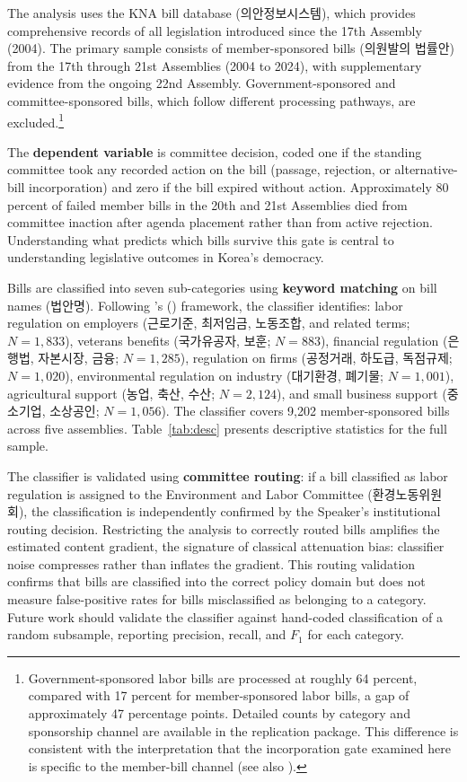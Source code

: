 \documentclass[11pt]{article}
\begin{document}
The analysis uses the KNA bill database (의안정보시스템), which provides comprehensive records of all legislation introduced since the 17th Assembly (2004). The primary sample consists of member-sponsored bills (의원발의 법률안) from the 17th through 21st Assemblies (2004 to 2024), with supplementary evidence from the ongoing 22nd Assembly. Government-sponsored and committee-sponsored bills, which follow different processing pathways, are excluded.\footnote{Government-sponsored labor bills are processed at roughly 64 percent, compared with 17 percent for member-sponsored labor bills, a gap of approximately 47 percentage points. Detailed counts by category and sponsorship channel are available in the replication package. This difference is consistent with the interpretation that the incorporation gate examined here is specific to the member-bill channel (see also \citealp{lee2021}).}

The \textbf{dependent variable} is committee decision, coded one if the standing committee took any recorded action on the bill (passage, rejection, or alternative-bill incorporation) and zero if the bill expired without action. Approximately 80 percent of failed member bills in the 20th and 21st Assemblies died from committee inaction after agenda placement rather than from active rejection. Understanding what predicts which bills survive this gate is central to understanding legislative outcomes in Korea's democracy.

Bills are classified into seven sub-categories using \textbf{keyword matching} on bill names (법안명). Following \citeauthor{wilson1980}'s (\citeyear{wilson1980}) framework, the classifier identifies: labor regulation on employers (근로기준, 최저임금, 노동조합, and related terms; $N = 1{,}833$), veterans benefits (국가유공자, 보훈; $N = 883$), financial regulation (은행법, 자본시장, 금융; $N = 1{,}285$), regulation on firms (공정거래, 하도급, 독점규제; $N = 1{,}020$), environmental regulation on industry (대기환경, 폐기물; $N = 1{,}001$), agricultural support (농업, 축산, 수산; $N = 2{,}124$), and small business support (중소기업, 소상공인; $N = 1{,}056$). The classifier covers 9,202 member-sponsored bills across five assemblies. Table~\ref{tab:desc} presents descriptive statistics for the full sample.

The classifier is validated using \textbf{committee routing}: if a bill classified as labor regulation is assigned to the Environment and Labor Committee (환경노동위원회), the classification is independently confirmed by the Speaker's institutional routing decision. Restricting the analysis to correctly routed bills amplifies the estimated content gradient, the signature of classical attenuation bias: classifier noise compresses rather than inflates the gradient. This routing validation confirms that bills are classified into the correct policy domain but does not measure false-positive rates for bills misclassified as belonging to a category. Future work should validate the classifier against hand-coded classification of a random subsample, reporting precision, recall, and $F_1$ for each category.
\end{document}
